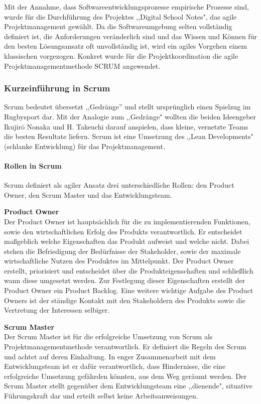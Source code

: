 Mit der Annahme, dass Softwareentwicklungsprozesse empirische Prozesse sind, wurde für die Durchführung des Projektes ,,Digital School Notes", das agile Projektmanagement gewählt. Da die Softwareumgebung selten vollständig definiert ist, die Anforderungen veränderlich sind und das Wissen und Können für den besten Lösungsansatz oft unvollständig ist, wird ein agiles Vorgehen einem klassischen vorgezogen. Konkret wurde für die Projektkoordination die agile Projektmanagementmethode SCRUM angewendet.


\subsubsection{Kurzeinführung in Scrum}
Scrum bedeutet übersetzt ,,Gedränge'' und stellt ursprünglich einen Spielzug im Rugbysport dar. Mit der Analogie zum ,,Gedränge" wollten die beiden Ideengeber  Ikujirō Nonaka und H. Takeuchi darauf anspielen, dass kleine, vernetzte Teams die besten Resultate liefern. Scrum ist eine Umsetzung des ,,Lean Developments" (schlanke Entwicklung) für das Projektmanagement.
\paragraph{Rollen in Scrum}
Scrum definiert als agiler Ansatz drei unterschiedliche Rollen: den Product Owner, den Scrum Master und das Entwicklungsteam.

\textbf{Product Owner}\\
Der Product Owner ist hauptsächlich für die zu implementierenden Funktionen, sowie den wirtschaftlichen Erfolg des Produkts verantwortlich. Er entscheidet maßgeblich welche Eigenschaften das Produkt aufweist und welche nicht. Dabei stehen die Befriedigung der Bedürfnisse der Stakeholder, sowie der maximale wirtschaftliche Nutzen des Produktes im Mittelpunkt. Der Product Owner erstellt, priorisiert und entscheidet über die Produkteigenschaften und schließlich wann diese umgesetzt werden. Zur Festlegung dieser Eigenschaften erstellt der Product Owner ein Product Backlog. Eine weitere wichtige Aufgabe des Product Owners ist der ständige Kontakt mit den Stakeholdern des Produkts sowie die Vertretung der Interessen selbiger. 

\textbf{Scrum Master}\\
Der Scrum Master ist für die erfolgreiche Umsetzung von Scrum als Projektmanagementmethode verantwortlich. Er definiert die Regeln des Scrum und achtet auf deren Einhaltung. In enger Zusammenarbeit mit dem Entwicklungsteam ist er dafür verantwortlich, dass Hindernisse, die eine erfolgreiche Umsetzung gefährden könnten, aus dem Weg geräumt werden. Der Scrum Master stellt gegenüber dem Entwicklungsteam eine ,,dienende", situative Führungskraft dar und erteilt selbst keine Arbeitsanweisungen.

